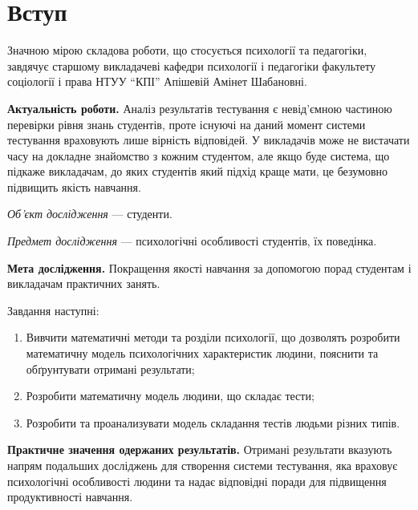 \chapter*{Вступ}

Значною мірою складова роботи, що стосується психології та педагогіки, завдячує
старшому викладачеві кафедри психології і педагогіки
факультету соціології і права НТУУ ``КПІ'' Апішевій Амінет Шабановні.

\textbf{Актуальність роботи.}
Аналіз результатів тестування є невід’ємною частиною перевірки рівня знань
студентів, проте існуючі на даний момент системи тестування враховують
лише вірність відповідей.
У викладачів може не вистачати часу на докладне знайомство з кожним студентом,
але якщо буде система, що підкаже викладачам, до яких
студентів який підхід краще мати, це безумовно підвищить якість навчання.

\textit{Об’єкт дослідження} ---
студенти.

\textit{Предмет дослідження} ---
психологічні особливості студентів, їх поведінка.

\textbf{Мета дослідження.}
Покращення якості навчання за допомогою порад студентам і викладачам
практичних занять.

Завдання наступні:
\begin{enumerate}
  \item
    Вивчити математичні методи та розділи психології, що дозволять розробити
    математичну модель психологічних характеристик людини,
    пояснити та обґрунтувати отримані результати;
  \item
    Розробити математичну модель людини, що складає тести;
  \item
    Розробити та проанализувати модель складання тестів людьми різних типів.
\end{enumerate}

\textbf{Практичне значення одержаних результатів.}
Отримані результати
вказують напрям подальших досліджень для створення системи тестування,
яка враховує психологічні особливості людини та надає відповідні поради
для підвищення продуктивності навчання.
